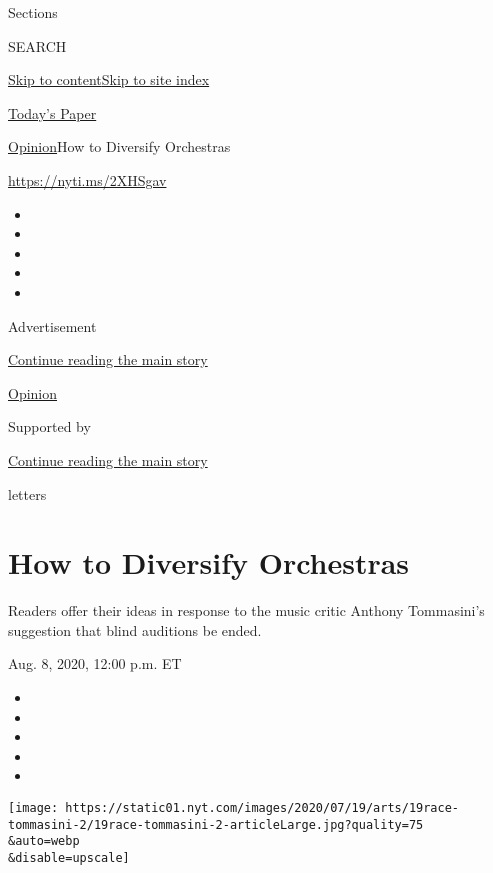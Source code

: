 Sections

SEARCH

\protect\hyperlink{site-content}{Skip to
content}\protect\hyperlink{site-index}{Skip to site index}

\href{https://myaccount.nytimes.com/auth/login?response_type=cookie\&client_id=vi}{}

\href{https://www.nytimes.com/section/todayspaper}{Today's Paper}

\href{/section/opinion}{Opinion}\textbar{}How to Diversify Orchestras

\href{https://nyti.ms/2XHSgav}{https://nyti.ms/2XHSgav}

\begin{itemize}
\item
\item
\item
\item
\item
\end{itemize}

Advertisement

\protect\hyperlink{after-top}{Continue reading the main story}

\href{/section/opinion}{Opinion}

Supported by

\protect\hyperlink{after-sponsor}{Continue reading the main story}

letters

\hypertarget{how-to-diversify-orchestras}{%
\section{How to Diversify
Orchestras}\label{how-to-diversify-orchestras}}

Readers offer their ideas in response to the music critic Anthony
Tommasini's suggestion that blind auditions be ended.

Aug. 8, 2020, 12:00 p.m. ET

\begin{itemize}
\item
\item
\item
\item
\item
\end{itemize}

\texttt{[image: https://static01.nyt.com/images/2020/07/19/arts/19race-tommasini-2/19race-tommasini-2-articleLarge.jpg?quality=75\\\&auto=webp\\\&disable=upscale]}

